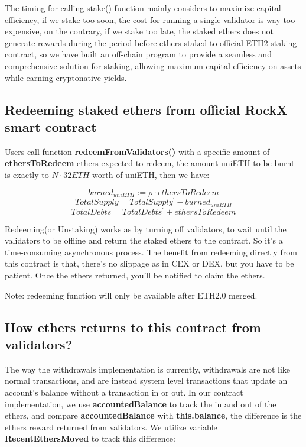 \documentclass{article}
\begin{document}
The timing for calling stake() function mainly considers to maximize capital efficiency, if we stake too soon, the cost for running a single validator is way too expensive, on the contrary, if we stake too late, the staked ethers does not generate rewards during the period before ethers staked to official ETH2 staking contract, so we have built an off-chain program to provide a seamless and comprehensive solution for staking, allowing maximum capital efficiency on assets while earning cryptonative yields.

\subsection{Redeeming staked ethers from official RockX smart contract}
Users call function \textbf{redeemFromValidators()} with a specific amount of \textbf{ethersToRedeem} ethers expected to redeem, the amount uniETH to be burnt is exactly to $N\cdot 32ETH$ worth of uniETH, then we have:
\begin{theorem}
\label{Redeem}
\[burned_{uniETH} := \rho \cdot ethersToRedeem \]
\[TotalSupply = TotalSupply^{\prime} - burned_{uniETH} \]
\[TotalDebts = TotalDebts^{\prime} + ethersToRedeem\]
\end{theorem}
Redeeming(or Unstaking) works as by turning off validators, to wait until the validators to be offline and return the staked ethers to the contract. So it's a time-consuming asynchronous process. The benefit from redeeming directly from this contract is that, there's no slippage as in CEX or DEX, but you have to be patient. Once the ethers returned, you'll be notified to claim the ethers.

Note: redeeming function will only be available after ETH2.0 merged.

\subsection{How ethers returns to this contract from validators? }
\label{sectionAccounting}

The way the withdrawals implementation is currently, withdrawals are not like normal transactions, and are instead system level transactions that update an account's balance without a transaction in or out. In our contract implementation, we use \textbf{accountedBalance} to track the in and out of the ethers, and compare \textbf{accountedBalance} with \textbf{this.balance}, the difference is the ethers reward returned from validators. We utilize variable \textbf{RecentEthersMoved} to track this difference:
\end{document}
